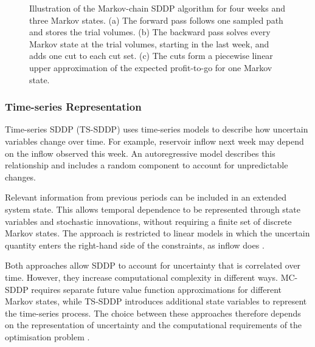 \begin{figure}[H]
\centering
\caption{Illustration of the Markov-chain SDDP algorithm for four weeks and three Markov states. (a) The forward pass follows one sampled path and stores the trial volumes. (b) The backward pass solves every Markov state at the trial volumes, starting in the last week, and adds one cut to each cut set. (c) The cuts form a piecewise linear upper approximation of the expected profit-to-go for one Markov state.}
\label{fig:sddp}
\end{figure}

\subsubsection{Time-series Representation}

Time-series SDDP (TS-SDDP) uses time-series models to
describe how uncertain variables change over time.
For example, reservoir inflow next week may depend
on the inflow observed this week. An autoregressive
model describes this relationship and includes a
random component to account for unpredictable changes.

Relevant information from previous periods can be
included in an extended system state. This allows
temporal dependence to be represented through state
variables and stochastic innovations, without requiring
a finite set of discrete Markov states. The approach is restricted to linear models in which the uncertain quantity enters the right-hand side of the constraints, as inflow does
\parencite{lohndorfShapiro2019}.

Both approaches allow SDDP to account for uncertainty
that is correlated over time. However, they increase
computational complexity in different ways. MC-SDDP
requires separate future value function approximations
for different Markov states, while TS-SDDP introduces
additional state variables to represent the time-series
process. The choice between these approaches therefore
depends on the representation of uncertainty and the
computational requirements of the optimisation problem
\parencite[secs.~14.1 and 14.4]{fullnerRebennack2025}.

